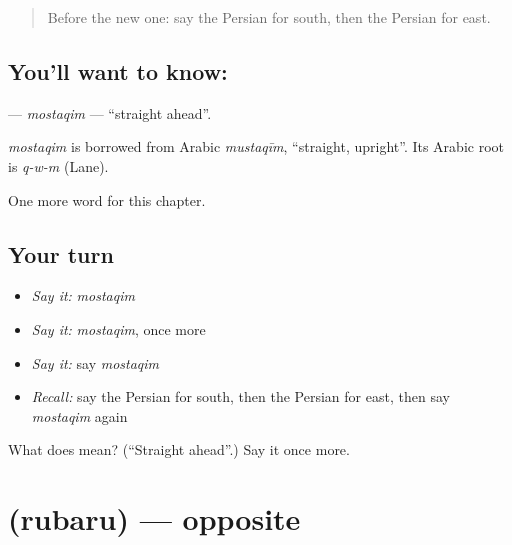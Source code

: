 \label{lesson:FA-C230-mostaqim}



\begin{quote}
Before the new one: say the Persian for south, then the Persian for east.
\end{quote}

\subsection*{You'll want to know: }
\textbf{} — \emph{mostaqim} — \textquotedblleft{}straight ahead\textquotedblright{}.

\begin{cousinweb}
\emph{mostaqim} is borrowed from Arabic \emph{mustaqīm}, \textquotedblleft{}straight, upright\textquotedblright{}. Its Arabic root is \emph{q-w-m} (Lane).
\end{cousinweb}

\begin{grammarlens}[title={What you've built}]
One more word for this chapter.
\end{grammarlens}

\subsection*{Your turn}
\begin{itemize}
\raggedright
  \item \emph{Say it:} \emph{mostaqim}
  \item \emph{Say it:} \emph{mostaqim}, once more
  \item \emph{Say it:} say \emph{mostaqim}
  \item \emph{Recall:} say the Persian for south, then the Persian for east, then say \emph{mostaqim} again
\end{itemize}

\begin{tcolorbox}[breakable,colback=teal!4,colframe=teal!35!black,title={Before you move on}]
What does  mean? (\textquotedblleft{}Straight ahead\textquotedblright{}.) Say it once more.
\end{tcolorbox}
\section[\texorpdfstring{\fa{روبرو} (rubaru)}{روبرو (rubaru)}]{ (rubaru) — opposite}

\label{lesson:FA-C230-rubaru}



